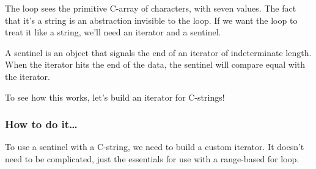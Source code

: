 The loop sees the primitive C-array of characters, with seven values. The fact that it's a string is an abstraction invisible to the loop. If we want the loop to treat it like a string, we'll need an iterator and a sentinel.

A sentinel is an object that signals the end of an iterator of indeterminate length. When the iterator hits the end of the data, the sentinel will compare equal with the iterator.

To see how this works, let's build an iterator for C-strings!

\subsubsection{How to do it…}

To use a sentinel with a C-string, we need to build a custom iterator. It doesn't need to be complicated, just the essentials for use with a range-based for loop.

